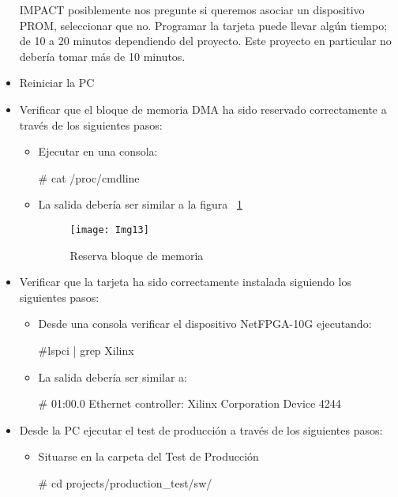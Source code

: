 \begin{itemize}
IMPACT posiblemente nos pregunte si queremos asociar un dispositivo PROM, seleccionar que no. Programar la tarjeta puede llevar algún tiempo; de 10 a 20 minutos dependiendo del proyecto. Este proyecto en particular no debería tomar más de 10 minutos.

\item Reiniciar la PC

\item Verificar que el bloque de memoria DMA ha sido reservado correctamente a través de los siguientes pasos:

\begin{itemize}
\item Ejecutar en una consola:
\begin{bash}    
# cat /proc/cmdline
\end{bash}    
  
\item La salida debería ser similar a la figura ~\ref{fig:Img13}

\begin{figure}[htbp!] 
\centering    
\texttt{[image: Img13]}
\caption[Reserva bloque de memoria]{Reserva bloque de memoria}
\label{fig:Img13}
\end{figure}

\end{itemize}

\item Verificar que la tarjeta ha sido correctamente instalada siguiendo los siguientes pasos:

\begin{itemize}
\item Desde una consola verificar el dispositivo NetFPGA-10G ejecutando:
\begin{bash}
#lspci | grep Xilinx
\end{bash}

\item La salida debería ser similar a:
\begin{bash}
# 01:00.0 Ethernet controller: Xilinx Corporation Device 4244
\end{bash}

\end{itemize}

\item Desde la PC ejecutar el test de producción a través de los siguientes pasos:

\begin{itemize}
\item Situarse en la carpeta del Test de Producción
\begin{bash}
# cd projects/production_test/sw/
\end{bash}


\end{itemize}
\end{itemize}
